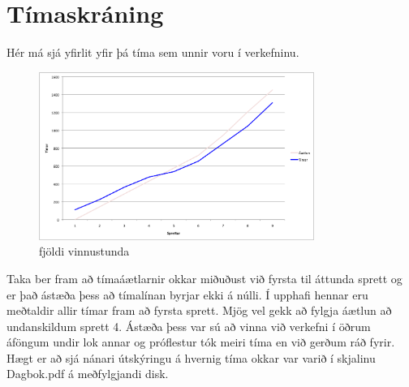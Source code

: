 \documentclass{article}
\begin{document}
\newpage	
\section{Tímaskráning}
Hér má sjá yfirlit yfir þá tíma sem unnir voru í verkefninu. 

\begin{figure}[H]
  \centering
  \includegraphics[width=0.8\textwidth]{fjoldi_vinnustunda.png} 
  \caption{fjöldi vinnustunda} 
\end{figure}

Taka ber fram að tímaáætlarnir okkar miðuðust við fyrsta til áttunda sprett og er það 
ástæða þess að tímalínan byrjar ekki á núlli. Í upphafi hennar eru meðtaldir allir tímar 
fram að fyrsta sprett.
Mjög vel gekk að fylgja áætlun að undanskildum sprett 4. Ástæða þess var sú að 
vinna við verkefni í öðrum áföngum undir lok annar og próflestur tók meiri tíma en við gerðum ráð fyrir.
Hægt er að sjá nánari útskýringu á hvernig tíma okkar var varið í skjalinu Dagbok.pdf á meðfylgjandi disk.
\end{document}
